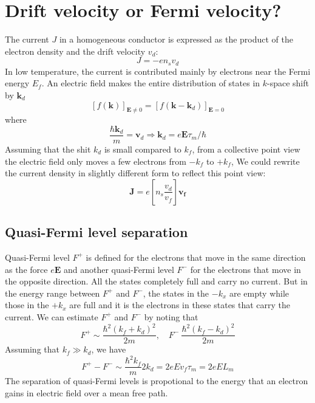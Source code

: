 \documentclass[11pt,a4paper]{book}
\theoremstyle{plain}
\theoremstyle{definition}
\theoremstyle{remark}
\renewcommand{\vec}[1]{\boldsymbol{#1}}
\begin{document}
\section{Drift velocity or Fermi velocity?}
The current $J$ in a homogeneous conductor is expressed as the product of the electron density and the drift velocity $v_d$:
\begin{equation}
    J = -e n_s v_d
\end{equation}
In low temperature, the current is contributed mainly by electrons near the Fermi energy $E_f$. An electric field makes the entire distribution of states in $k$-space shift by $\vec{k}_d$
\begin{equation}
    \left[f(\vec{k})\right]_{\vec{E}\neq 0} = \left[f(\vec{k} - \vec{k}_d)\right]_{\vec{E}=0}
\end{equation}
where
\begin{equation}
    \frac{\hbar \vec{k}_d}{m} = \vec{v}_d \Rightarrow \vec{k}_d=e\vec{E}\tau_m/\hbar
\end{equation}
Assuming that the shit $k_d$ is small compared to $k_f$, from a collective point view the electric field only moves a few electrons from $-k_f$ to $+k_f$, We could rewrite the current density in slightly different form to reflect this point view:
\begin{equation}
    \vec{J} = e \left[ n_s \frac{v_d}{v_f}\right] \vec{v_f}
\end{equation}
\subsection{Quasi-Fermi level separation}
Quasi-Fermi level $F^+$ is defined for the electrons that move in the same direction as the force $e\vec{E}$ and another quasi-Fermi level $F^-$ for the electrons that move in the opposite direction. All the states completely full and carry no current. But in the energy range between $F^+$ and $F^-$, the states in the $-k_x$ are empty while those in the $+k_x$ are full and it is the electrons in these states that carry the current. We can estimate $F^+$ and $F^-$ by noting that
\begin{equation}
    F^+ \sim \frac{\hbar^2 (k_f+k_d)^2}{2m}, \quad F^- ~ \frac{\hbar^2 (k_f-k_d)^2}{2m}
\end{equation}
Assuming that $k_f \gg k_d$, we have
\begin{equation}
    F^+ - F^- \sim \frac{\hbar^2 k_f}{m} 2 k_d = 2e E v_f\tau_m = 2eEL_m
\end{equation}
The separation of quasi-Fermi levels is propotional to the energy that an electron gains in electric field over a mean free path.
\end{document}
